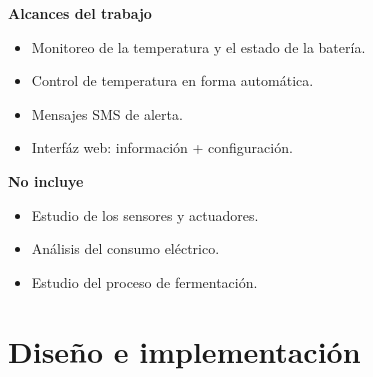 \documentclass[11pt]{beamer}
\begin{document}
\begin{frame}{\textbf{\LARGE{Alcances del trabajo}}}
  \fontsize{18pt}{18}\selectfont
  \begin{minipage}[c]{1.0\linewidth}
    \centering
      \begin{itemize}
        \item Monitoreo de la temperatura y el estado de la batería.
          \vspace{10px}
        \item Control de temperatura en forma automática.
          \vspace{10px}      	
        \item Mensajes SMS de alerta.
          \vspace{10px}
        \item Interfáz web: información + configuración.
          \vspace{10px}
      \end{itemize}
  \end{minipage}
\end{frame}


\begin{frame}{\textbf{\LARGE{No incluye}}}
  \fontsize{18pt}{18}\selectfont
  \begin{minipage}[c]{1.0\linewidth}
    \centering
      \begin{itemize}
        \item Estudio de los sensores y actuadores.
          \vspace{10px}
        \item Análisis del consumo eléctrico.
          \vspace{10px}
        \item Estudio del proceso de fermentación.
          \vspace{10px}
      \end{itemize}
  \end{minipage}
\end{frame}


\section{Diseño e implementación}
\end{document}
